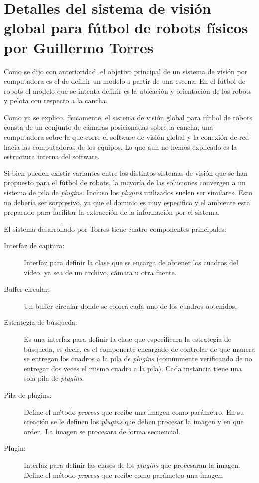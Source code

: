 
\section{Detalles del sistema de visión global para fútbol de robots físicos por
Guillermo Torres}

Como se dijo con anterioridad, el objetivo principal de un sistema de visión por
computadora es el de definir un modelo a partir de una escena. En el fútbol de
robots el modelo que se intenta definir es la ubicación y orientación de los
robots y pelota con respecto a la cancha.

Como ya se explico, físicamente, el sistema de visión global para fútbol de
robots consta de un conjunto de cámaras posicionadas sobre la cancha, una
computadora sobre la que corre el software de visión global y la conexión de red
hacia las computadoras de los equipos. Lo que aun no hemos explicado es la
estructura interna del software.

Si bien pueden existir variantes entre los distintos sistemas de visión que se
han propuesto para el fútbol de robots, la mayoría de las soluciones convergen a
un sistema de pila de \emph{plugins}. Incluso los \emph{plugins} utilizados
suelen ser similares. Esto no debería ser sorpresivo, ya que el dominio es muy
especifico y el ambiente esta preparado para facilitar la extracción de la
información por el sistema.

El sistema desarrollado por Torres tiene cuatro componentes principales:

\begin{description}

\item[Interfaz de captura:] Interfaz para definir la clase que se encarga de
	obtener los cuadros del vídeo, ya sea de un archivo, cámara u otra
	fuente.

\item[Buffer circular:] Un buffer circular donde se coloca cada uno de los
	cuadros obtenidos.

\item[Estrategia de búsqueda:] Es una interfaz para definir la clase que
	especificara la estrategia de búsqueda, es decir, es el componente
	encargado de controlar de que manera se entregan los cuadros a la pila
	de \emph{plugins} (comúnmente verificando de no entregar dos veces el
	mismo cuadro a la pila). Cada instancia tiene una sola pila de
	\emph{plugins}.
	
\item[Pila de plugins:] Define el método \emph{process} que recibe una imagen
	como parámetro. En su creación se le definen los \emph{plugins} que
	deben procesar la imagen y en que orden. La imagen se procesara de forma
	secuencial.

\item[Plugin:] Interfaz para definir las clases de los \emph{plugins} que
	procesaran la imagen. Define el método \emph{process} que recibe como
	parámetro una imagen.

\end{description}

